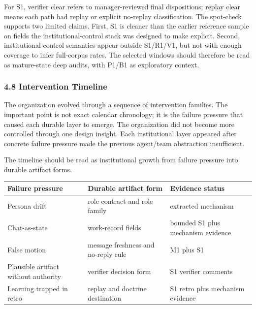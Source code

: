 \documentclass[
]{article}
\newcounter{none} %
\begin{document}
For S1, verifier clear refers to manager-reviewed final dispositions; replay clear means each path had replay or explicit no-replay classification. The spot-check supports two limited claims. First, S1 is cleaner than the earlier reference sample on fields the institutional-control stack was designed to make explicit. Second, institutional-control semantics appear outside S1/R1/V1, but not with enough coverage to infer full-corpus rates. The selected windows should therefore be read as mature-state deep audits, with P1/B1 as exploratory context.

\subsubsection{4.8 Intervention Timeline}\label{intervention-timeline}

The organization evolved through a sequence of intervention families. The important point is not exact calendar chronology; it is the failure pressure that caused each durable layer to emerge. The organization did not become more controlled through one design insight. Each institutional layer appeared after concrete failure pressure made the previous agent/team abstraction insufficient.

The timeline should be read as institutional growth from failure pressure into durable artifact forms.

{\def\LTcaptype{none} %
\begin{longtable}[]{@{}
  >{\raggedright\arraybackslash}p{}
  >{\raggedright\arraybackslash}p{}
  >{\raggedright\arraybackslash}p{}@{}}
\toprule\noalign{}
\begin{minipage}[b]{\linewidth}\raggedright
Failure pressure
\end{minipage} & \begin{minipage}[b]{\linewidth}\raggedright
Durable artifact form
\end{minipage} & \begin{minipage}[b]{\linewidth}\raggedright
Evidence status
\end{minipage} \\
\midrule\noalign{}
\endhead
\bottomrule\noalign{}
\endlastfoot
Persona drift & role contract and role family & extracted mechanism \\
Chat-as-state & work-record fields & bounded S1 plus mechanism evidence \\
False motion & message freshness and no-reply rule & M1 plus S1 \\
Plausible artifact without authority & verifier decision form & S1 verifier comments \\
Learning trapped in retro & replay and doctrine destination & S1 retro plus mechanism evidence \\
\end{longtable}
}
\end{document}
